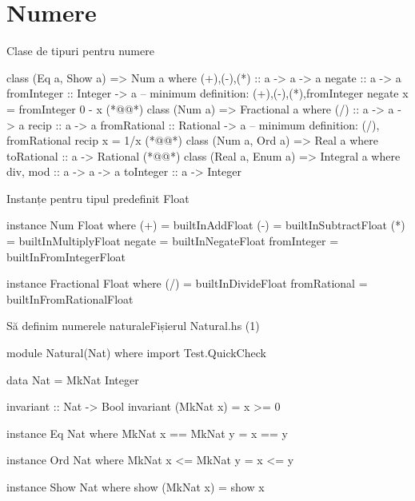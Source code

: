 \documentclass[handout,xcolor=pdftex,romanian,colorlinks]{beamer}
\begin{document}
\section{Numere}
\begin{frame}[fragile]{Clase de tipuri pentru numere}
\vspace{-2ex}
\begin{asciihs}
  class (Eq a, Show a) => Num a where
    (+),(-),(*)   :: a -> a -> a
    negate        :: a -> a
    fromInteger   :: Integer -> a
    -- minimum definition: (+),(-),(*),fromInteger
    negate x      =   fromInteger 0 - x
(*@\vspace{-1ex}@*)
  class (Num a) => Fractional a where
    (/)           :: a -> a -> a
    recip         :: a -> a
    fromRational :: Rational -> a
    -- minimum definition: (/), fromRational
    recip x       =   1/x
(*@\vspace{-1ex}@*)
  class (Num a, Ord a) => Real a where
    toRational    :: a -> Rational
(*@\vspace{-1ex}@*)
  class (Real a, Enum a) => Integral a where
    div, mod      :: a -> a -> a
    toInteger     :: a -> Integer
\end{asciihs}
\end{frame}
\begin{frame}[fragile]{Instanțe pentru tipul predefinit Float}
\begin{asciihs}
  instance Num Float   where
    (+)           =    builtInAddFloat
    (-)           =    builtInSubtractFloat
    (*)           =    builtInMultiplyFloat
    negate        =    builtInNegateFloat
    fromInteger   =    builtInFromIntegerFloat

  instance Fractional Float where
    (/)           = builtInDivideFloat
    fromRational = builtInFromRationalFloat
\end{asciihs}
\end{frame}
\begin{frame}[fragile]{Să definim numerele naturale}{Fișierul Natural.hs \hfill(1)}
\begin{asciihs}
  module Natural(Nat) where
  import Test.QuickCheck

  data Nat = MkNat Integer

  invariant :: Nat -> Bool
  invariant (MkNat x) = x >= 0

  instance Eq Nat where
    MkNat x == MkNat y = x == y

  instance Ord Nat where
    MkNat x <= MkNat y = x <= y

  instance Show Nat where
    show (MkNat x) = show x
\end{asciihs}
\end{frame}
\end{document}
